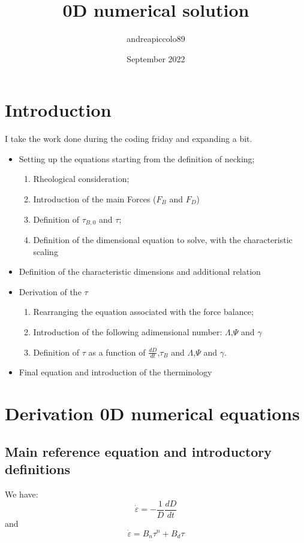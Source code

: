\documentclass{article}
\title{0D numerical solution}
\author{andreapiccolo89 }
\date{September 2022}
\begin{document}
\maketitle

\section{Introduction}

I take the work done during the coding friday and expanding a bit.

\begin{itemize}
    \item Setting up the equations starting from the definition of necking; 
    \begin{enumerate}
        \item Rheological consideration;
        \item Introduction of the main Forces ($F_B$ and $F_D$)
        \item Definition of $\tau_{B,0}$ and $\tau$; 
        \item Definition of the dimensional equation to solve, with the characteristic scaling
    \end{enumerate}
    
    \item Definition of the characteristic dimensions and additional relation
    
    \item Derivation of the $\tau$
    \begin{enumerate}
        \item Rearranging the equation associated with the force balance;
        \item Introduction of the following adimensional number: $\Lambda$,$\Psi$ and $\gamma$
        \item Definition of $\tau$ as  a function of $\frac{dD}{dt}$,$\tau_B$ and $\Lambda$,$\Psi$ and $\gamma$. 
    \end{enumerate}
    \item Final equation and introduction of the therminology
\end{itemize}


\section{Derivation 0D numerical equations}
\subsection{Main reference equation and introductory definitions}
We have:
\begin{equation}
    \dot{\varepsilon} = -\frac{1}{D} \frac{dD}{dt}
    \label{eq:eq1}
\end{equation}
and
\begin{equation}
    \dot{\varepsilon} = B_{n} \tau^n + B_{d} \tau
    \label{eq:rheology0}
\end{equation}
\end{document}
